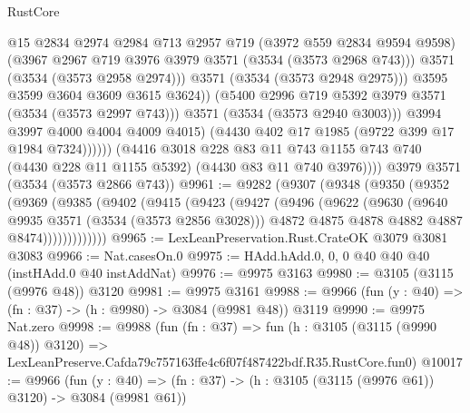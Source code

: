 \begin{lexlean}{RustCore}
\begin{coremodule}
                            @15
                            @2834
                            @2974
                            @2984
                            @713
                            @2957
                            @719
                            (@3972 @559 @2834 @9594 @9598)
                            (@3967 @2967 @719 @3976 @3979 @3571 (@3534 (@3573 @2968 @743)))
                            @3571
                            (@3534 (@3573 @2958 @2974)))
                          @3571
                          (@3534 (@3573 @2948 @2975)))
                        @3595
                        @3599
                        @3604
                        @3609
                        @3615
                        @3624))
                    (@5400 @2996 @719 @5392 @3979 @3571 (@3534 (@3573 @2997 @743)))
                    @3571
                    (@3534 (@3573 @2940 @3003)))
                  @3994
                  @3997
                  @4000
                  @4004
                  @4009
                  @4015)
                (@4430 @402 @17 @1985 (@9722 @399 @17 @1984 @7324))))))
        (@4416
          @3018
          @228
          @83
          @11
          @743
          @1155
          @743
          @740
          (@4430 @228 @11 @1155 @5392)
          (@4430 @83 @11 @740 @3976))))
    @3979
    @3571
    (@3534 (@3573 @2866 @743))
@9961 := @9282
    (@9307
      (@9348
        (@9350
          (@9352
            (@9369
              (@9385
                (@9402
                  (@9415
                    (@9423
                      (@9427
                        (@9496
                          (@9622
                            (@9630
                              (@9640 @9935 @3571 (@3534 (@3573 @2856 @3028)))
                              @4872
                              @4875
                              @4878
                              @4882
                              @4887
                              @8474)))))))))))))
@9965 := LexLeanPreservation.Rust.CrateOK @3079 @3081 @3083
@9966 := Nat.casesOn.{0}
@9975 := HAdd.hAdd.{0, 0, 0} @40 @40 @40 (instHAdd.{0} @40 instAddNat)
@9976 := @9975 @3163
@9980 := @3105 (@3115 (@9976 @48)) @3120
@9981 := @9975 @3161
@9988 := @9966 (fun (y : @40) => (fn : @37) -> (h : @9980) -> @3084 (@9981 @48)) @3119
@9990 := @9975 Nat.zero
@9998 := @9988
    (fun (fn : @37) =>
    fun (h : @3105 (@3115 (@9990 @48)) @3120) =>
    LexLeanPreserve.Cafda79c757163ffe4c6f07f487422bdf.R35.RustCore.fun0)
@10017 := @9966
    (fun (y : @40) => (fn : @37) -> (h : @3105 (@3115 (@9976 @61)) @3120) -> @3084 (@9981 @61))

\end{coremodule}
\end{lexlean}
